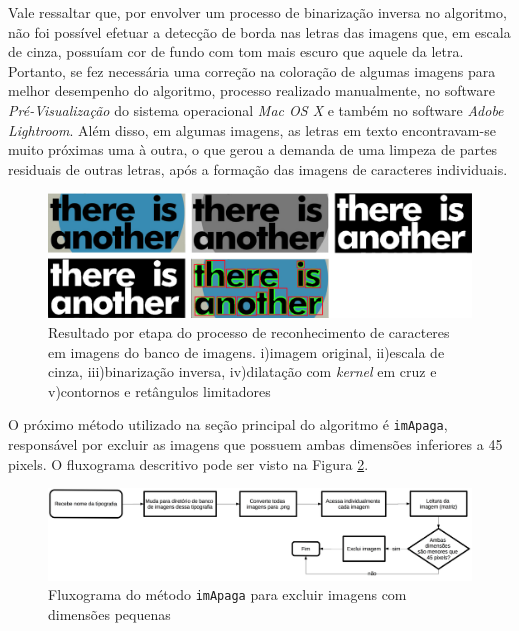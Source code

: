 Vale ressaltar que, por envolver um processo de binarização inversa no algoritmo, não foi possível efetuar a detecção de borda nas letras das imagens que, em escala de cinza, possuíam cor de fundo com tom mais escuro que aquele da letra. Portanto, se fez necessária uma correção na coloração de algumas imagens para melhor desempenho do algoritmo, processo realizado manualmente, no software \textit{Pré-Visualização} do sistema operacional \textit{Mac OS X} e também no software \textit{Adobe Lightroom}. Além disso, em algumas imagens, as letras em texto encontravam-se muito próximas uma à outra, o que gerou a demanda de uma limpeza de partes residuais de outras letras, após a formação das imagens de caracteres individuais.

\begin{figure}[H]
  \centering
  \includegraphics[width=0.9\linewidth]{figuras/imProcess2.pdf}
  \caption{Resultado por etapa do processo de reconhecimento de caracteres em imagens do banco de imagens. i)imagem original, ii)escala de cinza, iii)binarização inversa, iv)dilatação com \textit{kernel} em cruz e v)contornos e retângulos limitadores}
  \label{fig:imProcess}
\end{figure}

O próximo método utilizado na seção principal do algoritmo é \texttt{imApaga}, responsável por excluir as imagens que possuem ambas dimensões inferiores a 45 pixels. O fluxograma descritivo pode ser visto na Figura \ref{fig:flowimApaga}.


\begin{figure}[H]
  \centering
  \includegraphics[width=1\linewidth]{figuras/imApaga.pdf}
  \caption{Fluxograma do método \texttt{imApaga} para excluir imagens com dimensões pequenas}
  \label{fig:flowimApaga}
\end{figure}

